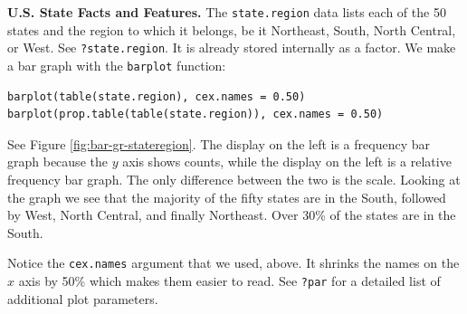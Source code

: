 \documentclass[captions=tableheading]{scrbook}
\begin{document}
\begin{example}
\textbf{U.S. State Facts and Features.} The \texttt{state.region} data lists each of the 50 states and the region to which it belongs, be it Northeast, South, North Central, or West. See \texttt{?state.region}. It is already stored internally as a factor. We make a bar graph with the \texttt{barplot} function: 



\begin{verbatim}
barplot(table(state.region), cex.names = 0.50)
barplot(prop.table(table(state.region)), cex.names = 0.50)
\end{verbatim}

See Figure \ref{fig:bar-gr-stateregion}. The display on the left is a frequency bar graph because the \(y\) axis shows counts, while the display on the left is a relative frequency bar graph. The only difference between the two is the scale. Looking at the graph we see that the majority of the fifty states are in the South, followed by West, North Central, and finally Northeast. Over 30\% of the states are in the South.

Notice the \texttt{cex.names} argument that we used, above. It shrinks the names on the \(x\) axis by 50\% which makes them easier to read. See \texttt{?par} for a detailed list of additional plot parameters.







\end{example}
\end{document}
